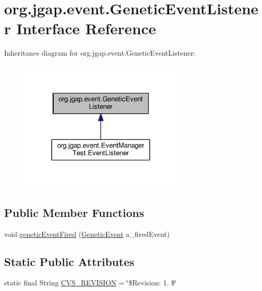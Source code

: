 \hypertarget{interfaceorg_1_1jgap_1_1event_1_1_genetic_event_listener}{\section{org.\-jgap.\-event.\-Genetic\-Event\-Listener Interface Reference}
\label{interfaceorg_1_1jgap_1_1event_1_1_genetic_event_listener}
}


Inheritance diagram for org.\-jgap.\-event.\-Genetic\-Event\-Listener\-:
\nopagebreak
\begin{figure}[H]
\begin{center}
\leavevmode
\includegraphics[width=224pt]{interfaceorg_1_1jgap_1_1event_1_1_genetic_event_listener__inherit__graph}
\end{center}
\end{figure}
\subsection*{Public Member Functions}
\begin{DoxyCompactItemize}
\item 
void \hyperlink{interfaceorg_1_1jgap_1_1event_1_1_genetic_event_listener_afd4a7e764a85efbe172e632148252b28}{genetic\-Event\-Fired} (\hyperlink{classorg_1_1jgap_1_1event_1_1_genetic_event}{Genetic\-Event} a\-\_\-fired\-Event)
\end{DoxyCompactItemize}
\subsection*{Static Public Attributes}
\begin{DoxyCompactItemize}
\item 
static final String \hyperlink{interfaceorg_1_1jgap_1_1event_1_1_genetic_event_listener_a79b554a46c545ae2797b9b1b5c362e1a}{C\-V\-S\-\_\-\-R\-E\-V\-I\-S\-I\-O\-N} = \char`\"{}\$Revision\-: 1. \$\char`\"{}
\end{DoxyCompactItemize}


